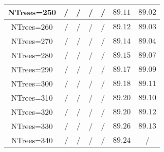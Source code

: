 \begin{tabular}{|c|c|c|c|c|c|c|}
NTrees=250 &  / &  / &  / &  / & $89.11$ & $89.02$\\\hline
NTrees=260 &  / &  / &  / &  / & $89.12$ & $89.03$\\\hline
NTrees=270 &  / &  / &  / &  / & $89.14$ & $89.04$\\\hline
NTrees=280 &  / &  / &  / &  / & $89.15$ & $89.07$\\\hline
NTrees=290 &  / &  / &  / &  / & $89.17$ & $89.09$\\\hline
NTrees=300 &  / &  / &  / &  / & $89.18$ & $89.11$\\\hline
NTrees=310 &  / &  / &  / &  / & $89.20$ & $89.10$\\\hline
NTrees=320 &  / &  / &  / &  / & $89.20$ & $89.12$\\\hline
NTrees=330 &  / &  / &  / &  / & $89.26$ & $89.13$\\\hline
NTrees=340 &  / &  / &  / &  / & $89.24$ &  /\\\hline
\end{tabular}
